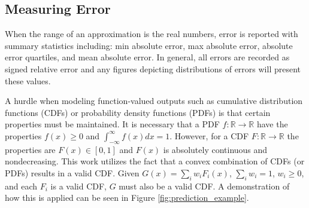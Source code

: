 \documentclass[smallextended]{svjour3}       %
\begin{document}
\subsection{Measuring Error}

When the range of an approximation is the real numbers, error is reported with summary statistics including: min absolute error, max absolute error, absolute error quartiles, and mean absolute error. In general, all errors are recorded as signed relative error and any figures depicting distributions of errors will present these values.

A hurdle when modeling function-valued outputs such as cumulative distribution functions (CDFs) or probability density functions (PDFs) is that certain properties must be maintained. It is necessary that a PDF $f: \mathbb{R} \rightarrow \mathbb{R}$ have the properties $f(x) \geq 0$ and $\int_{-\infty}^{\infty}f(x)dx = 1$. However, for a CDF $F: \mathbb{R} \rightarrow \mathbb{R}$ the properties are $F(x) \in [0,1]$ and $F(x)$ is absolutely continuous and nondecreasing. This work utilizes the fact that a convex combination of CDFs (or PDFs) results in a valid CDF. Given $G(x) = \sum_{i}w_i F_i(x)$, $\sum_{i} w_i = 1$, $w_i \geq 0$, and each $F_i$ is a valid CDF, $G$ must also be a valid CDF. A demonstration of how this is applied can be seen in Figure \ref{fig:prediction_example}.


\end{document}
